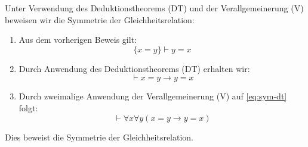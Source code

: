 \begin{math-stroke}
Unter Verwendung des Deduktionstheorems ($\text{DT}$) und der Verallgemeinerung ($\text{V}$) beweisen wir die Symmetrie der Gleichheitsrelation:

\begin{short-proof}
\begin{enumerate}[label=\textbf{(\arabic*)}]
    \setcounter{enumi}{0} \item Aus dem vorherigen Beweis gilt:
    \[ \{x = y\} \vdash y = x \]
    \item Durch Anwendung des Deduktionstheorems ($\text{DT}$) erhalten wir:
    \begin{equation}\label{eq:sym-dt}
    \vdash x = y \rightarrow y = x
    \end{equation}
    \item Durch zweimalige Anwendung der Verallgemeinerung ($\text{V}$) auf \eqref{eq:sym-dt} folgt:
    \begin{equation}\label{eq:sym-final}
    \vdash \forall x \forall y (x = y \rightarrow y = x)
    \end{equation}
\end{enumerate}
Dies beweist die Symmetrie der Gleichheitsrelation.
\end{short-proof}
\end{math-stroke}

